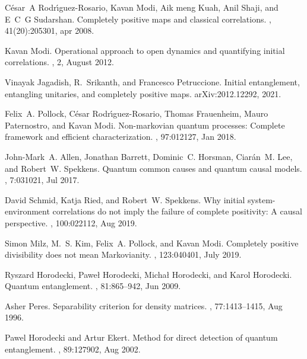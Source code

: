 \documentclass[12pt]{iopart}
\begin{document}
\begin{thebibliography}{10}
C{\'{e}}sar~A Rodr{\'{\i}}guez-Rosario, Kavan Modi, Aik meng Kuah, Anil Shaji,
  and E~C~G Sudarshan.
\newblock Completely positive maps and classical correlations.
,
  41(20):205301, apr 2008.

Kavan Modi.
\newblock Operational approach to open dynamics and quantifying initial
  correlations.
, 2, August 2012.

Vinayak Jagadish, R.~Srikanth, and Francesco Petruccione.
\newblock Initial entanglement, entangling unitaries, and completely positive
  maps.
\newblock arXiv:2012.12292, 2021.

Felix~A. Pollock, C\'esar Rodr\'{\i}guez-Rosario, Thomas Frauenheim, Mauro
  Paternostro, and Kavan Modi.
\newblock Non-markovian quantum processes: Complete framework and efficient
  characterization.
, 97:012127, Jan 2018.

John-Mark~A. Allen, Jonathan Barrett, Dominic~C. Horsman, Ciar\'an~M. Lee, and
  Robert~W. Spekkens.
\newblock Quantum common causes and quantum causal models.
, 7:031021, Jul 2017.

David Schmid, Katja Ried, and Robert~W. Spekkens.
\newblock Why initial system-environment correlations do not imply the failure
  of complete positivity: A causal perspective.
, 100:022112, Aug 2019.

Simon Milz, M.~S. Kim, Felix~A. Pollock, and Kavan Modi.
\newblock Completely positive divisibility does not mean {M}arkovianity.
, 123:040401, July 2019.

Ryszard Horodecki, Pawe\l{} Horodecki, Micha\l{} Horodecki, and Karol
  Horodecki.
\newblock Quantum entanglement.
, 81:865--942, Jun 2009.

Asher Peres.
\newblock Separability criterion for density matrices.
, 77:1413--1415, Aug 1996.

Pawel Horodecki and Artur Ekert.
\newblock Method for direct detection of quantum entanglement.
, 89:127902, Aug 2002.


\end{thebibliography}
\end{document}
